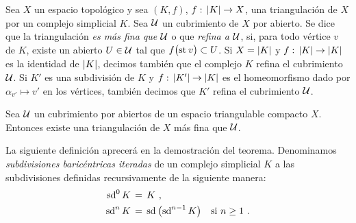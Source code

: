 Sea $X$ un espacio topol\'{o}gico y sea $(K,f)$, $f:\,\geom{K}\rightarrow X$,
una triangulaci\'{o}n de $X$ por un complejo simplicial $K$. Sea $\cal{U}$ un
cubrimiento de $X$ por abierto. Se dice que la triangulaci\'{o}n
\emph{es m\'{a}s fina que $\cal{U}$} o que \emph{refina a $\cal{U}$}, si,
para todo v\'{e}rtice $v$ de $K$, existe un abierto $U\in\cal{U}$ tal que
$f\big(\estrella v\big)\subset U$. Si $X=\geom{K}$ y
$f:\,\geom{K}\rightarrow\geom{K}$ es la identidad de $\geom K$, decimos
tambi\'{e}n que el complejo $K$ refina el cubrimiento $\cal U$. Si $K'$ es
una subdivisi\'{o}n de $K$ y $f:\,\geom{K'}\rightarrow\geom{K}$ es el
homeomorfismo dado por $\alpha_{v'}\mapsto v'$ en los v\'{e}rtices, tambi\'{e}n
decimos que $K'$ refina el cubrimiento $\cal U$.

\begin{teoRefinarPorTriangulaciones}\label{thm:refinarportriangulaciones}
	Sea $\cal U$ un cubrimiento por abiertos de un espacio triangulable
	compacto $X$. Entonces existe una triangulaci\'{o}n de $X$ m\'{a}s
	fina que $\cal U$.
\end{teoRefinarPorTriangulaciones}

La siguiente definici\'{o}n aprecer\'{a} en la demostraci\'{o}n del teorema.
Denominamos \emph{subdivisiones baric\'{e}ntricas iteradas} de un complejo
simplicial $K$ a las subdivisiones definidas recursivamente de la siguiente
manera:
\begin{align*}
	\subdiv[0]{K} & \,=\, K\text{ ,}\\
	\subdiv[n]{K} & \,=\,\subdiv{\big(\subdiv[n-1]{K}\big)}
		\quad\text{si } n\geq 1
	\text{ .}
\end{align*}
%

